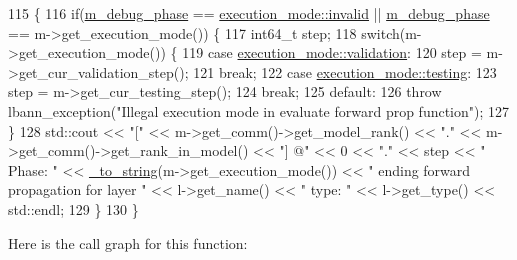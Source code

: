 \begin{DoxyCode}
115                                                                                \{
116   \textcolor{keywordflow}{if}(\hyperlink{classlbann_1_1lbann__callback__debug_acc66ab699534e42aa958148f1fb3fd6f}{m\_debug\_phase} == \hyperlink{base_8hpp_a2781a159088df64ed7d47cc91c4dc0a8afedb2d84cafe20862cb4399751a8a7e3}{execution\_mode::invalid} || 
      \hyperlink{classlbann_1_1lbann__callback__debug_acc66ab699534e42aa958148f1fb3fd6f}{m\_debug\_phase} == m->get\_execution\_mode()) \{
117     int64\_t step;
118     \textcolor{keywordflow}{switch}(m->get\_execution\_mode()) \{
119     \textcolor{keywordflow}{case} \hyperlink{base_8hpp_a2781a159088df64ed7d47cc91c4dc0a8aa617908b172c473cb8e8cda059e55bf0}{execution\_mode::validation}:
120       step = m->get\_cur\_validation\_step();
121       \textcolor{keywordflow}{break};
122     \textcolor{keywordflow}{case} \hyperlink{base_8hpp_a2781a159088df64ed7d47cc91c4dc0a8aae2b1fca515949e5d54fb22b8ed95575}{execution\_mode::testing}:
123       step = m->get\_cur\_testing\_step();
124       \textcolor{keywordflow}{break};
125     \textcolor{keywordflow}{default}:
126       \textcolor{keywordflow}{throw} lbann\_exception(\textcolor{stringliteral}{"Illegal execution mode in evaluate forward prop function"});
127     \}
128     std::cout << \textcolor{stringliteral}{"["} << m->get\_comm()->get\_model\_rank() << \textcolor{stringliteral}{"."} << m->get\_comm()->get\_rank\_in\_model() << \textcolor{stringliteral}{"]
       @"} << 0 << \textcolor{stringliteral}{"."} << step << \textcolor{stringliteral}{" Phase: "} << \hyperlink{base_8hpp_adeeaddd10bd31df0cae7cb0fcae45d5c}{\_to\_string}(m->get\_execution\_mode()) << \textcolor{stringliteral}{"   ending forward
       propagation for layer "} << l->get\_name() << \textcolor{stringliteral}{" type: "} << l->get\_type() << std::endl;
129   \}
130 \}
\end{DoxyCode}
Here is the call graph for this function\+:\nopagebreak
